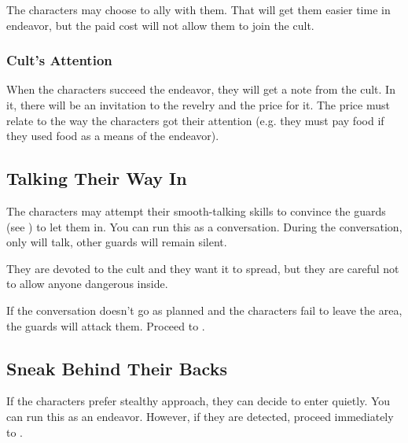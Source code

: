 The characters may choose to ally with them. That will get them easier time in  endeavor, but the paid cost will not allow them to join the cult.


\subsubsection{Cult's Attention}

When the characters succeed the endeavor, they will get a note from the cult. In it, there will be an invitation to the revelry and the price for it. The price must relate to the way the characters got their attention (e.g. they must pay food if they used food as a means of the endeavor).






\subsection{Talking Their Way In}

The characters may attempt their smooth-talking skills to convince the guards (see ) to let them in. You can run this as a conversation. During the conversation, only \enemyRevelerMasked{} will talk, other guards will remain silent.

They are devoted to the cult and they want it to spread, but they are careful not to allow anyone dangerous inside.


If the conversation doesn't go as planned and the characters fail to leave the area, the guards will attack them. Proceed to .




\subsection{Sneak Behind Their Backs}
\label{ssec:cityEscapePlanSneak}

If the characters prefer stealthy approach, they can decide to enter quietly. You can run this as an endeavor. However, if they are detected, proceed immediately to .

